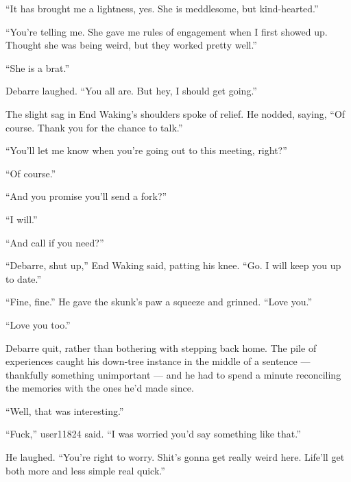 ``It has brought me a lightness, yes. She is meddlesome, but kind-hearted.''

``You're telling me. She gave me rules of engagement when I first showed up. Thought she was being weird, but they worked pretty well.''

``She is a brat.''

Debarre laughed. ``You all are. But hey, I should get going.''

The slight sag in End Waking's shoulders spoke of relief. He nodded, saying, ``Of course. Thank you for the chance to talk.''

``You'll let me know when you're going out to this meeting, right?''

``Of course.''

``And you promise you'll send a fork?''

``I will.''

``And call if you need?''

``Debarre, shut up,'' End Waking said, patting his knee. ``Go. I will keep you up to date.''

``Fine, fine.'' He gave the skunk's paw a squeeze and grinned. ``Love you.''

``Love you too.''

Debarre quit, rather than bothering with stepping back home. The pile of experiences caught his down-tree instance in the middle of a sentence — thankfully something unimportant — and he had to spend a minute reconciling the memories with the ones he'd made since.

``Well, that was interesting.''

``Fuck,'' user11824 said. ``I was worried you'd say something like that.''

He laughed. ``You're right to worry. Shit's gonna get really weird here. Life'll get both more and less simple real quick.''
